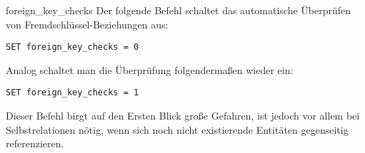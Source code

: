 \begin{sql}{foreign\_key\_checks}
    Der folgende Befehl schaltet das automatische Überprüfen von Fremdschlüssel-Beziehungen aus:

    \begin{lstlisting}[language=mysql]
        SET foreign_key_checks = 0
    \end{lstlisting}

    Analog schaltet man die Überprüfung folgendermaßen wieder ein:
    
    \begin{lstlisting}[language=mysql]
        SET foreign_key_checks = 1
    \end{lstlisting}

    Dieser Befehl birgt auf den Ersten Blick große Gefahren, ist jedoch vor allem bei Selbstrelationen nötig, wenn sich noch nicht existierende Entitäten gegenseitig referenzieren.
\end{sql}